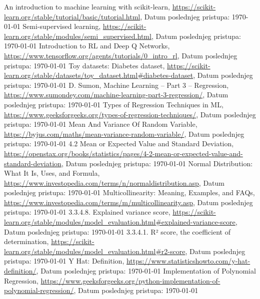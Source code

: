 \documentclass[fontsize=12bp, paper=a4]{scrarticle}
\begin{document}
\begin{thebibliography}{1}
  An introduction to machine learning with scikit-learn, \url{https://scikit-learn.org/stable/tutorial/basic/tutorial.html}, Datum poslednjeg pristupa: \today
  Semi-supervised learning, \url{https://scikit-learn.org/stable/modules/semi_supervised.html}, Datum poslednjeg pristupa: \today
  Introduction to RL and Deep Q Networks, \url{https://www.tensorflow.org/agents/tutorials/0_intro_rl}, Datum poslednjeg pristupa: \today
  Toy datasets: Diabetes dataset, \url{https://scikit-learn.org/stable/datasets/toy_dataset.html#diabetes-dataset}, Datum poslednjeg pristupa: \today
  D. Sumon, Machine Learning – Part 3 – Regression, \url{https://www.sumondey.com/machine-learning-part-3-regression/}, Datum poslednjeg pristupa: \today
    Types of Regression Techniques in ML, \url{https://www.geeksforgeeks.org/types-of-regression-techniques/}, Datum poslednjeg pristupa: \today
    Mean And Variance Of Random Variable, \url{https://byjus.com/maths/mean-variance-random-variable/}, Datum poslednjeg pristupa: \today
    4.2 Mean or Expected Value and Standard Deviation, \url{https://openstax.org/books/statistics/pages/4-2-mean-or-expected-value-and-standard-deviation}, Datum poslednjeg pristupa: \today
    Normal Distribution: What It Is, Uses, and Formula, \url{https://www.investopedia.com/terms/n/normaldistribution.asp}, Datum poslednjeg pristupa: \today
    Multicollinearity: Meaning, Examples, and FAQs, \url{https://www.investopedia.com/terms/m/multicollinearity.asp}, Datum poslednjeg pristupa: \today
    3.3.4.8. Explained variance score, \url{https://scikit-learn.org/stable/modules/model_evaluation.html#explained-variance-score}, Datum poslednjeg pristupa: \today
    3.3.4.1. R² score, the coefficient of determination, \url{https://scikit-learn.org/stable/modules/model_evaluation.html#r2-score}, Datum poslednjeg pristupa: \today
    Y Hat: Definition, \url{https://www.statisticshowto.com/y-hat-definition/}, Datum poslednjeg pristupa: \today
    Implementation of Polynomial Regression, \url{https://www.geeksforgeeks.org/python-implementation-of-polynomial-regression/}, Datum poslednjeg pristupa: \today

\end{thebibliography}
\end{document}

